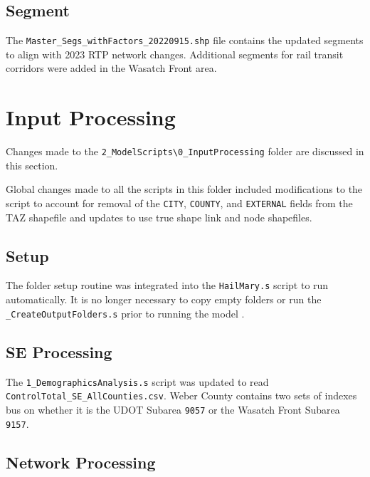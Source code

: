 \documentclass[
  letterpaper,
  DIV=11,
  numbers=noendperiod]{scrreprt}
\begin{document}
\hypertarget{segment}{%
\section{Segment}\label{segment}}

The \texttt{Master\_Segs\_withFactors\_20220915.shp} file contains the
updated segments to align with 2023 RTP network changes. Additional
segments for rail transit corridors were added in the Wasatch Front
area.


\hypertarget{input-processing}{%
\chapter{Input Processing}\label{input-processing}}

Changes made to the
\texttt{2\_ModelScripts\textbackslash{}0\_InputProcessing} folder are
discussed in this section.

Global changes made to all the scripts in this folder included
modifications to the script to account for removal of the \texttt{CITY},
\texttt{COUNTY}, and \texttt{EXTERNAL} fields from the TAZ shapefile and
updates to use true shape link and node shapefiles.

\hypertarget{setup}{%
\section{Setup}\label{setup}}

The folder setup routine was integrated into the \texttt{HailMary.s}
script to run automatically. It is no longer necessary to copy empty
folders or run the \texttt{\_CreateOutputFolders.s} prior to running the
model .

\hypertarget{se-processing}{%
\section{SE Processing}\label{se-processing}}

The \texttt{1\_DemographicsAnalysis.s} script was updated to read \\
\texttt{ControlTotal\_SE\_AllCounties.csv}. Weber County contains two
sets of indexes bus on whether it is the UDOT Subarea \texttt{9057} or
the Wasatch Front Subarea \texttt{9157}.

\hypertarget{network-processing}{%
\section{Network Processing}\label{network-processing}}
\end{document}
